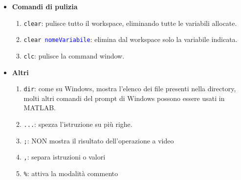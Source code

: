 \begin{itemize}
    \item    \textbf{Comandi di pulizia}\\
            \begin{enumerate}
                \item \texttt{clear}: pulisce tutto il workspace, eliminando tutte le variabili allocate.
                \item \texttt{clear \textcolor{blue}{nomeVariabile}}: elimina dal workspace solo la variabile indicata.
                \item \texttt{clc}: pulisce la command window.
            \end{enumerate}
        
    \item   \textbf{Altri }  \\
            \begin{enumerate}
                \item \texttt{dir}: come su Windows, mostra l'elenco dei file presenti nella directory, molti altri 
                comandi del prompt di Windows possono essere usati in MATLAB.
                \item \texttt{...}: spezza l'istruzione su più righe.
                \item \texttt{;}: NON mostra il risultato dell'operazione a video
                \item \texttt{,}: separa istruzioni o valori
                \item \texttt{\%}: attiva la modalità commento
            \end{enumerate}
\end{itemize}
